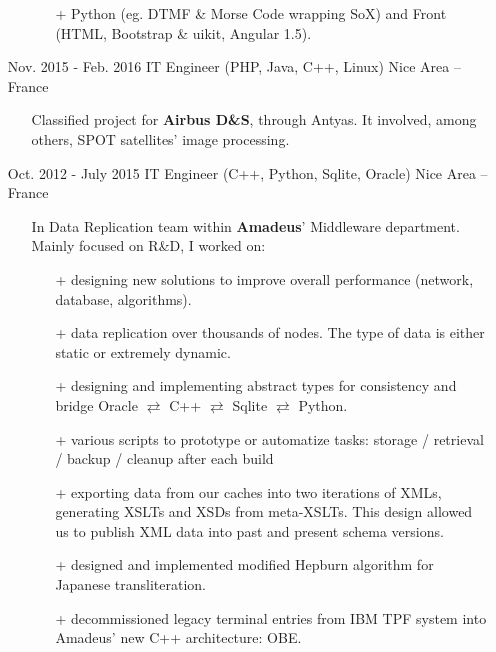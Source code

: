 \documentclass{res}
\begin{document}
\begin{resume}
\begin{itemize}
\begin{itemize}
\begin{itemize}
                \item[+] Python (eg. DTMF \& Morse Code wrapping SoX) and Front (HTML, Bootstrap \& uikit, Angular 1.5).
            \end{itemize}
        \end{itemize}
        \item[] Nov. 2015 - Feb. 2016 \tabto{5cm} IT Engineer (PHP, Java, C++, Linux) \hfill Nice Area -- France
            \begin{itemize}
                \item[] Classified project for \textbf{Airbus D\&S}, through Antyas. It involved, among others, SPOT satellites' image processing.
            \end{itemize}
        \item[] Oct. 2012 - July 2015 \tabto{5cm} IT Engineer (C++, Python, Sqlite, Oracle) \hfill Nice Area -- France
        \begin{itemize}
            \item[] In Data Replication team within \textbf{Amadeus}' Middleware department. Mainly focused on R\&D, I worked on:
            \begin{itemize}
                \item[+] designing new solutions to improve overall performance (network, database, algorithms).
                \item[+] data replication over thousands of nodes. The type of data is either static or extremely dynamic.
                \item[+] designing and implementing abstract types for consistency and bridge Oracle $\rightleftarrows$ C++ $\rightleftarrows$ Sqlite $\rightleftarrows$ Python.
                \item[+] various scripts to prototype or automatize tasks: storage / retrieval / backup / cleanup after each build\textellipsis
                \item[+] exporting data from our caches into two iterations of XMLs, generating XSLTs and XSDs from meta-XSLTs. This design allowed us to publish XML data into past and present schema versions.
                \item[+] designed and implemented modified Hepburn algorithm for Japanese transliteration.
                \item[+] decommissioned legacy terminal entries from IBM TPF system into Amadeus' new C++ architecture: OBE.
            \end{itemize}
        \end{itemize}

\end{itemize}
\end{resume}
\end{document}
